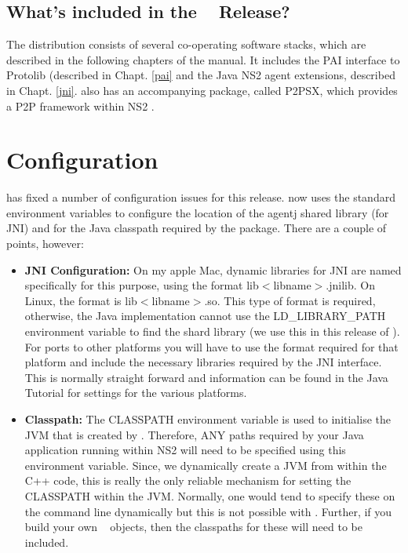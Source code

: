 \subsection{What's included in the \agentj~ Release?}
\label{install:p2ps-ns2-included}

The \agentj distribution consists of several co-operating
software stacks, which are described in the following chapters of the 
manual.  It includes the PAI interface to Protolib (described in Chapt.
\ref{pai} and the Java NS2 agent extensions, described in Chapt.
\ref{jni}. \agentj also has an accompanying package, called P2PSX,
which provides a P2P framework within NS2 \cite{p2psx}.

\section{Configuration}
\label{install:configuration}

\agentj has fixed a number of configuration issues for this release. \agentj
now uses the standard environment variables to configure the location of the
agentj shared library (for JNI) and for the Java classpath required by the
package.  There are a couple of points, however: 

\begin{itemize}

\item \textbf{JNI Configuration:} On my apple Mac, dynamic libraries for JNI
are named specifically for this purpose, using the format
lib$<$libname$>$.jnilib.  On Linux, the format is lib$<$libname$>$.so.  This
type of format is required, otherwise, the Java implementation cannot use the
LD\_LIBRARY\_PATH environment variable to find the shard library (we use this
in this release of \agentj). For ports to other platforms you will have to use
the format required for that platform and include the necessary libraries
required by the JNI interface.  This is normally straight forward and
information can be found in the Java Tutorial \cite{javaTutorial} for settings
for the various platforms.  

\item \textbf{Classpath:} The CLASSPATH environment variable is used to
initialise the JVM that is created by \agentj. Therefore, ANY paths required by
your Java application running within NS2 will need to be specified using this
environment variable.  Since, we dynamically create a JVM from within the C++
code, this is really the only reliable mechanism for setting the CLASSPATH
within the JVM.   Normally, one would tend to specify these on the command line
dynamically but this is not possible with \agentj.  Further, if you build your
own \agentj~ objects, then the classpaths for these will need to be included. 

\end{itemize}

